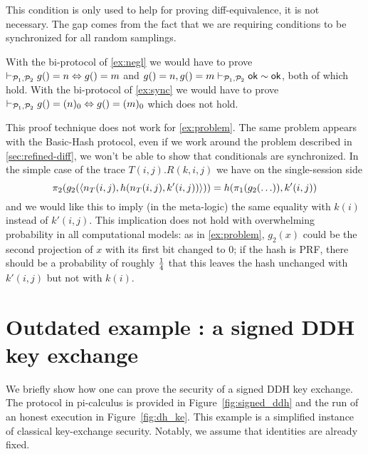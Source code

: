 This condition is only used to help for proving diff-equivalence, it is not necessary.
The gap comes from the fact that we are requiring conditions to be
synchronized for all random samplings.

\begin{example}
  With the bi-protocol of \cref{ex:negl} we would have to prove
  $\vdash_{\mathcal{P}_1,\mathcal{P}_2} g() = n \Leftrightarrow g() = m$ and
  $g()=n, g()=m \vdash_{\mathcal{P}_1,\mathcal{P}_2} \mathsf{ok} \sim \mathsf{ok}$, both of which hold.
  With the bi-protocol of \cref{ex:sync} we would have to prove
  $\vdash_{\mathcal{P}_1,\mathcal{P}_2} g() = (n)_0 \Leftrightarrow g() = (m)_0$ which does not hold.
\end{example}

\begin{example} \label{ex:indep}
  This proof technique does not work for \cref{ex:problem}.
  The same problem appears with the Basic-Hash protocol, even if we work around
  the problem described in \cref{sec:refined-diff}, we won't be able to show
  that conditionals are synchronized.  In the simple case of the trace
  $T(i,j).R(k,i,j)$ we have
  on the single-session side
  $$\pi_2(g_2(\langle n_T(i,j),h(n_T(i,j),k'(i,j)) \rangle)) =
  h(\pi_1(g_2(\ldots)),k'(i,j))$$
  and we would like this to imply (in the meta-logic)
  the same equality with $k(i)$ instead of $k'(i,j)$.
  This implication does not hold with overwhelming probability in all
  computational models: as in \cref{ex:problem}, $g_2(x)$ could be the second
  projection of $x$ with its first bit changed to $0$; if the hash is PRF,
  there should be a probability of roughly $1 \over 4$ that this leaves
  the hash unchanged with $k'(i,j)$ but not with $k(i)$.
\end{example}

\section{Outdated example : a signed DDH key exchange}

We briefly show how one can prove the security of a signed DDH key exchange. The protocol in pi-calculus is provided in Figure~\ref{fig:signed_ddh} and the run of an honest execution in Figure~\ref{fig:dh_ke}. This example is a simplified instance of classical key-exchange security. Notably, we assume that identities are already fixed.

